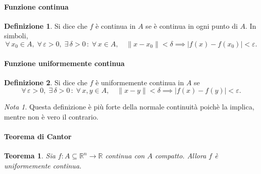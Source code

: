 \documentclass{article}
\theoremstyle{plain}
\newtheorem{thm}{Teorema}[section]
\theoremstyle{definition}
\newtheorem{defn}{Definizione}[section]
\theoremstyle{remark}
\newtheorem{note}{Nota}
\begin{document}
\vspace{10pt}

\paragraph{Funzione continua}
\begin{bxthm}
\begin{defn}
    Si dice che $f$ è continua in $A$ se è continua in ogni punto di $A$.
    In simboli,
    \[\forall\, x_0\in A,\;\forall\,\varepsilon>0,\;\exists\,\delta>0\,:\;\forall\, x\in A,\quad\| x-x_0 \|<\delta \implies|f(x)-f(x_0)|<\varepsilon.\]
\end{defn}
\end{bxthm}

\vspace{10pt}

\paragraph{Funzione uniformemente continua}
\begin{bxthm}
\begin{defn}
    Si dice che $f$ è uniformemente continua in $A$ se 
    \[\forall\,\varepsilon>0,\;\exists\,\delta>0\,:\;\forall\, x,y\in A,\quad\| x-y \|<\delta\implies |f(x)-f(y)|<\varepsilon.\]
\end{defn}
\end{bxthm}

\vspace{10pt}

\begin{note}
    Questa definizione è più forte della normale continuità poichè la implica, mentre non è vero il contrario.
\end{note}

\vspace{10pt}

\paragraph{Teorema di Cantor}
\begin{bxthm}
\begin{thm}
    Sia $f:A\subseteq\mathbb{R}^n\to\mathbb{R}$ continua con $A$ compatto.
    Allora $f$ è uniformemente continua.
\end{thm}
\end{bxthm}

\vspace{10pt}
\end{document}

